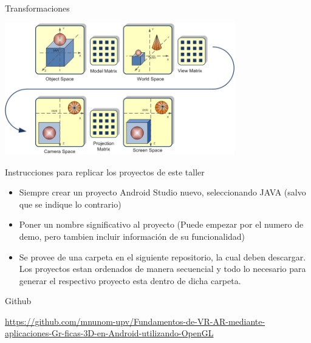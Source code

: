 \documentclass[aspectratio=169,compress]{beamer}
\begin{document}
\begin{frame}{Transformaciones}
    \begin{center}
    \includegraphics[width=0.75\textwidth]{FigsOpenGL/ModelViewProjection_MVP_Matrix}
    \end{center}
\end{frame}

	






\begin{frame}{Instrucciones para replicar los proyectos de este taller }
\begin{itemize}
\item Siempre crear un proyecto Android Studio nuevo, seleccionando JAVA (salvo que se indique lo contrario)
\item Poner un nombre significativo al proyecto (Puede empezar por el numero de demo, pero tambien incluir información de su funcionalidad)
\item Se provee de una carpeta en el siguiente repositorio, la cual deben descargar. Los proyectos estan ordenados de manera secuencial y todo lo necesario para generar el respectivo proyecto esta dentro de dicha carpeta.

\end{itemize}
\begin{block}{Github}
\begin{center}
\tiny
\url{https://github.com/mnunom-upv/Fundamentos-de-VR-AR-mediante-aplicaciones-Gr-ficas-3D-en-Android-utilizando-OpenGL}
\end{center}
\end{block}

\end{frame}


\end{document}

